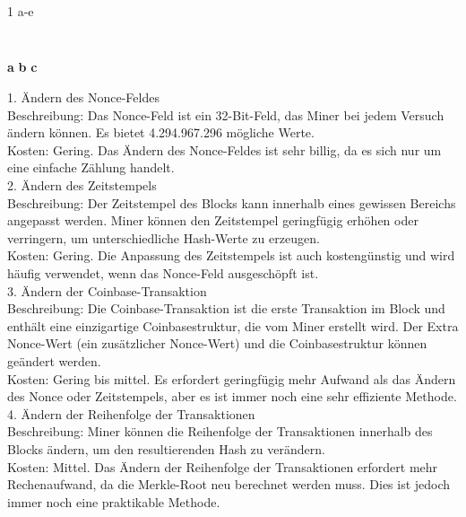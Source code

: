 \documentclass[german]{../uebung}
\begin{document}
\begin{exercise}{1 a-e}
    \begin{lstlisting}[language=Python]
        
    \end{lstlisting}
\end{exercise}

\begin{exercise}{2}
    \textbf{a}
    \textbf{b}
    \textbf{c}
\end{exercise}

\begin{exercise}{3}
    1. Ändern des Nonce-Feldes \\
    Beschreibung: Das Nonce-Feld ist ein 32-Bit-Feld, das Miner bei jedem Versuch ändern können. Es bietet 4.294.967.296 mögliche Werte.\\
    Kosten: Gering. Das Ändern des Nonce-Feldes ist sehr billig, da es sich nur um eine einfache Zählung handelt.\\
    2. Ändern des Zeitstempels\\
    Beschreibung: Der Zeitstempel des Blocks kann innerhalb eines gewissen Bereichs angepasst werden. Miner können den Zeitstempel geringfügig erhöhen oder verringern, um unterschiedliche Hash-Werte zu erzeugen.\\
    Kosten: Gering. Die Anpassung des Zeitstempels ist auch kostengünstig und wird häufig verwendet, wenn das Nonce-Feld ausgeschöpft ist.\\
    3. Ändern der Coinbase-Transaktion\\
    Beschreibung: Die Coinbase-Transaktion ist die erste Transaktion im Block und enthält eine einzigartige Coinbasestruktur, die vom Miner erstellt wird. Der Extra Nonce-Wert (ein zusätzlicher Nonce-Wert) und die Coinbasestruktur können geändert werden.\\
    Kosten: Gering bis mittel. Es erfordert geringfügig mehr Aufwand als das Ändern des Nonce oder Zeitstempels, aber es ist immer noch eine sehr effiziente Methode.\\
    4. Ändern der Reihenfolge der Transaktionen\\
    Beschreibung: Miner können die Reihenfolge der Transaktionen innerhalb des Blocks ändern, um den resultierenden Hash zu verändern.\\
    Kosten: Mittel. Das Ändern der Reihenfolge der Transaktionen erfordert mehr Rechenaufwand, da die Merkle-Root neu berechnet werden muss. Dies ist jedoch immer noch eine praktikable Methode.\\

\end{exercise}
\end{document}
